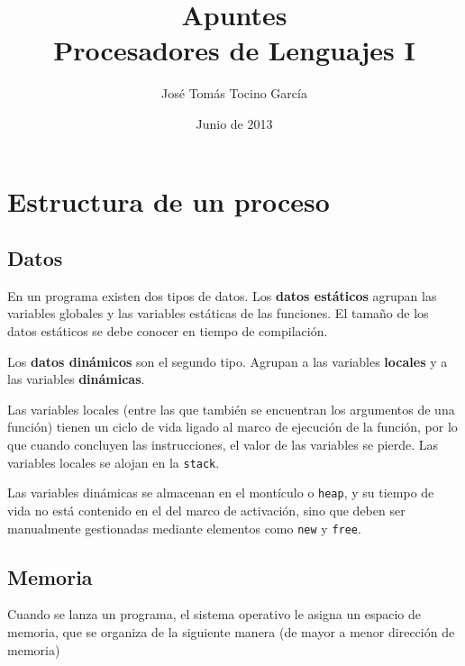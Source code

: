 \documentclass[11pt]{scrartcl}
\title{\Huge{Apuntes}\\[0.2cm]\LARGE{Procesadores de Lenguajes I}}
\author{José Tomás Tocino García}
\date{Junio de 2013}
\begin{document}
\maketitle
\tableofcontents

\section{Estructura de un proceso}

\subsection{Datos}

En un programa existen dos tipos de datos. Los \textbf{datos estáticos} agrupan
las variables globales y las variables estáticas de las funciones. El tamaño de
los datos estáticos se debe conocer en tiempo de compilación.

Los \textbf{datos dinámicos} son el segundo tipo. Agrupan a las variables
\textbf{locales} y a las variables \textbf{dinámicas}. 

Las variables locales (entre las que también se encuentran los argumentos de una
función) tienen un ciclo de vida ligado al marco de ejecución de la función, por
lo que cuando concluyen las instrucciones, el valor de las variables se
pierde. Las variables locales se alojan en la \texttt{stack}.

Las variables dinámicas se almacenan en el montículo o \texttt{heap}, y su
tiempo de vida no está contenido en el del marco de activación, sino que deben
ser manualmente gestionadas mediante elementos como \texttt{new} y
\texttt{free}.

\subsection{Memoria}

Cuando se lanza un programa, el sistema operativo le asigna un espacio de
memoria, que se organiza de la siguiente manera (de mayor a menor dirección de
memoria)

\medskip

\begin{center}
  \begin{drawstackbare}
     
    \cell{$\Downarrow$}
    \cell{$\Uparrow$}
  \end{drawstackbare}
\end{center}
\end{document}
